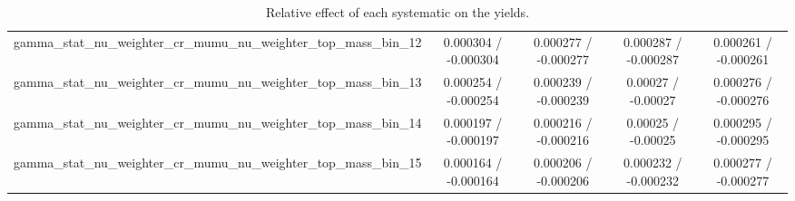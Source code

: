 \documentclass[10pt]{article}
\begin{document}
\begin{table}[htbp]
\begin{center}
\begin{tabular}{|c|c|c|c|c|}
  gamma_stat_nu_weighter_cr_mumu_nu_weighter_top_mass_bin_12 & 0.000304 / -0.000304 & 0.000277 / -0.000277 & 0.000287 / -0.000287 & 0.000261 / -0.000261 \\ 
  gamma_stat_nu_weighter_cr_mumu_nu_weighter_top_mass_bin_13 & 0.000254 / -0.000254 & 0.000239 / -0.000239 & 0.00027 / -0.00027 & 0.000276 / -0.000276 \\ 
  gamma_stat_nu_weighter_cr_mumu_nu_weighter_top_mass_bin_14 & 0.000197 / -0.000197 & 0.000216 / -0.000216 & 0.00025 / -0.00025 & 0.000295 / -0.000295 \\ 
  gamma_stat_nu_weighter_cr_mumu_nu_weighter_top_mass_bin_15 & 0.000164 / -0.000164 & 0.000206 / -0.000206 & 0.000232 / -0.000232 & 0.000277 / -0.000277 \\ 
\hline 
\end{tabular} 
\caption{Relative effect of each systematic on the yields.} 
\end{center} 
\end{table} 
\end{document}
